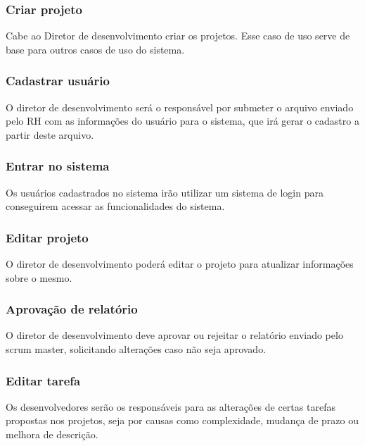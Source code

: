 \subsubsection{Criar projeto}
  Cabe ao Diretor de desenvolvimento criar os projetos. Esse caso de uso serve de base para outros casos de uso do sistema.
\subsubsection{Cadastrar usuário}
O diretor de desenvolvimento será o responsável por submeter o arquivo enviado pelo RH com as informações do usuário para o sistema, que irá gerar o cadastro a partir deste arquivo.
\subsubsection{Entrar no sistema}
  Os usuários cadastrados no sistema irão utilizar um sistema de login para conseguirem acessar as funcionalidades do sistema.
\subsubsection{Editar projeto}
O diretor de desenvolvimento poderá editar o projeto para atualizar informações sobre o mesmo.
\subsubsection{Aprovação de relatório}
O diretor de desenvolvimento deve aprovar ou rejeitar o relatório enviado  pelo scrum master, solicitando alterações caso não seja aprovado.
\subsubsection{Editar tarefa}
  Os desenvolvedores serão os responsáveis para as alterações de certas tarefas propostas nos projetos, seja por causas como complexidade, mudança de prazo ou melhora de descrição.
